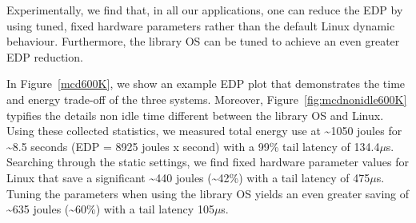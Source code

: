 \documentclass[pageno]{jpaper}
\begin{document}
Experimentally, we find that, in all our applications, one can reduce the EDP by using tuned, fixed hardware parameters rather than the default Linux dynamic behaviour. Furthermore, the library OS can be tuned to achieve an even greater EDP reduction. 

In Figure~\ref{mcd600K}, we show an example EDP plot that demonstrates the time and energy trade-off of the three systems. Moreover, Figure~\ref{fig:mcdnonidle600K} typifies the details non idle time different between the library OS and Linux. Using these collected statistics, we measured total energy use at {\textasciitilde}1050 joules for {\textasciitilde}8.5 seconds (EDP = 8925 joules x second) with a 99\% tail latency of 134.4{$\mu$}s. Searching through the static settings, we find fixed hardware parameter values for Linux that save a significant {\textasciitilde}440 joules ({\textasciitilde}42\%) with a tail latency of 475{$\mu$}s.  Tuning the parameters when using the library OS yields an even greater saving of {\textasciitilde}635 joules ({\textasciitilde}60\%) with a tail latency 105{$\mu$}s. 

%
%
%

\end{document}
